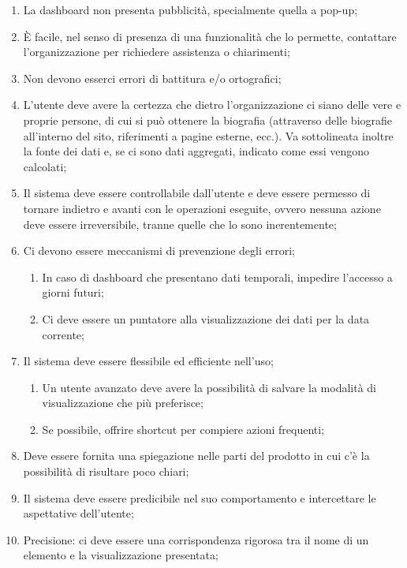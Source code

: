 \begin{enumerate}
    \item La dashboard non presenta pubblicità, specialmente quella a pop-up;\label{lg:21}
    \item \`E facile, nel senso di presenza di una funzionalità che lo permette, contattare l'organizzazione per richiedere assistenza o chiarimenti\label{lg:22};
    \item Non devono esserci errori di battitura e/o ortografici\label{lg:23};
    \item L'utente deve avere la certezza che dietro l'organizzazione ci siano delle vere e proprie persone, di cui si può ottenere la biografia (attraverso delle biografie all'interno del sito, riferimenti a pagine esterne, ecc.). Va sottolineata inoltre la fonte dei dati e, se ci sono dati aggregati, indicato come essi vengono calcolati;\label{lg:24}
    \item Il sistema deve essere controllabile dall'utente e deve essere permesso di tornare indietro e avanti con le operazioni eseguite, ovvero nessuna azione deve essere irreversibile, tranne quelle che lo sono inerentemente;\label{lg:25}
    \item Ci devono essere meccanismi di prevenzione degli errori;\label{lg:26}
    \begin{enumerate}
        \item In caso di dashboard che presentano dati temporali, impedire l'accesso a giorni futuri;
        \item Ci deve essere un puntatore alla visualizzazione dei dati per la data corrente;
    \end{enumerate}
\item Il sistema deve essere flessibile ed efficiente nell'uso;\label{lg:27}
    \begin{enumerate}
        \item Un utente avanzato deve avere la possibilità di salvare la modalità di visualizzazione che più preferisce;
        \item Se possibile, offrire shortcut per compiere azioni frequenti;
    \end{enumerate}
    \item Deve essere fornita una spiegazione nelle parti del prodotto in cui c'è la possibilità di risultare poco chiari;\label{lg:28}
    \item Il sistema deve essere predicibile nel suo comportamento e intercettare le aspettative dell'utente;\label{lg:29}
    \item Precisione: ci deve essere una corrispondenza rigorosa tra il nome di un elemento e la visualizzazione presentata;\label{lg:30}

\end{enumerate}

